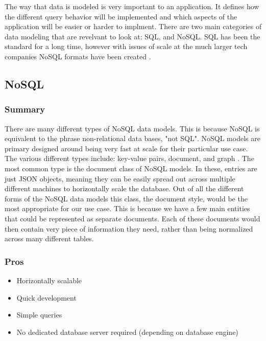     The way that data is modeled is very important to an application.  It defines how the different query behavior will be implemented and which aspects of the application will be easier or harder to implment.  There are two main categories of data modeling that are revelvant to look at: SQL, and NoSQL.  SQL has been the standard for a long time, however with issues of scale at the much larger tech companies NoSQL formats have been created \cite{sqlizer}.
    
    \subsection{NoSQL}
    
        \subsubsection{Summary}
        
        There are many different types of NoSQL data models.  This is because NoSQL is equivalent to the phrase non-relational data bases, "not SQL".  NoSQL models are primary designed around being very fast at scale for their particular use case.  The various different types include: key-value pairs, document, and graph \cite{amazon_nosql}.  The most common type is the document class of NoSQL models.  In these, entries are just JSON objects, meaning they can be easily spread out across multiple different machines to horizontally scale the database.  Out of all the different forms of the NoSQL data models this class, the document style, would be the most appropriate for our use case.  This is because we have a few main entities that could be represented as separate documents.  Each of these documents would then contain very piece of information they need, rather than being normalized across many different tables.
        
        \subsubsection{Pros}
        
        \begin{itemize}
            \item Horizontally scalable
            \item Quick development
            \item Simple queries
            \item No dedicated database server required (depending on database engine)
        \end{itemize}
        
